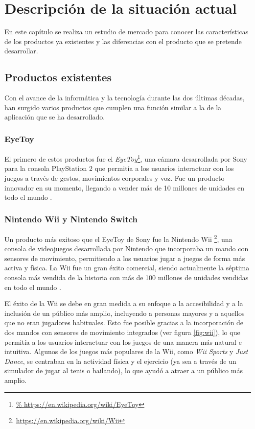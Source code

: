 \chapter{Descripción de la situación actual}
\label{cap:situacion}
En este capítulo se realiza un estudio de mercado para conocer las
características de los productos ya existentes y las diferencias con el producto
que se pretende desarrollar.

\section{Productos existentes}
\label{sec:productos-existentes}
Con el avance de la informática y la tecnología durante las dos últimas décadas,
han surgido varios productos que cumplen una función similar a la de la
aplicación que se ha desarrollado.

\subsection{EyeToy}
\label{subsec:eyetoy}
El primero de estos productos fue el \textit{EyeToy}\footnote{\url{%
https://en.wikipedia.org/wiki/EyeToy}}, una cámara desarrollada por Sony para la
consola PlayStation 2 que permitía a los usuarios interactuar con los juegos a
través de gestos, movimientos corporales y voz. Fue un producto innovador en su
momento, llegando a vender más de 10 millones de unidades en todo el mundo
\parencite{Kim2025Jun}.


\subsection{Nintendo Wii y Nintendo Switch}
Un producto más exitoso que el EyeToy de Sony fue la Nintendo Wii%
\footnote{\url{https://en.wikipedia.org/wiki/Wii}}, una consola de videojuegos
desarrollada por Nintendo que incorporaba un mando con sensores de movimiento,
permitiendo a los usuarios jugar a juegos de forma más activa y física. La Wii
fue un gran éxito comercial, siendo actualmente la séptima consola más vendida
de la historia \parencite{WikipediaBestSellingConsoles} con más de 100 millones
de unidades vendidas en todo el mundo \parencite{NintendoSalesData}.

El éxito de la Wii se debe en gran medida a su enfoque a la accesibilidad y a la
inclusión de un público más amplio, incluyendo a personas mayores y a aquellos
que no eran jugadores habituales. Esto fue posible gracias a la incorporación de
dos mandos con sensores de movimiento integrados (ver figura \ref{fig:wii}), lo
que permitía a los usuarios interactuar con los juegos de una manera más natural
e intuitiva. Algunos de los juegos más populares de la Wii, como \textit{Wii
Sports} y \textit{Just Dance}, se centraban en la actividad física y el
ejercicio (ya sea a través de un simulador de jugar al tenis o bailando), lo que
ayudó a atraer a un público más amplio.

